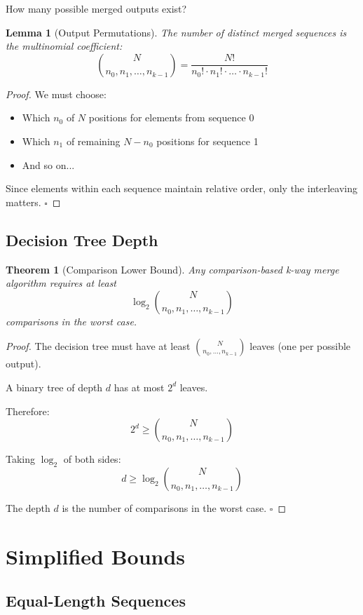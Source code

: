 \documentclass[11pt]{article}
\newtheorem{theorem}{Theorem}
\newtheorem{lemma}{Lemma}
\begin{document}
How many possible merged outputs exist?

\begin{lemma}[Output Permutations]
The number of distinct merged sequences is the multinomial coefficient:
\[
\binom{N}{n_0, n_1, \ldots, n_{k-1}} = \frac{N!}{n_0! \cdot n_1! \cdot \ldots \cdot n_{k-1}!}
\]
\end{lemma}

\begin{proof}
We must choose:
\begin{itemize}
    \item Which $n_0$ of $N$ positions for elements from sequence 0
    \item Which $n_1$ of remaining $N-n_0$ positions for sequence 1
    \item And so on...
\end{itemize}

Since elements within each sequence maintain relative order, only the interleaving matters.
$\square$
\end{proof}

\subsection{Decision Tree Depth}

\begin{theorem}[Comparison Lower Bound]
Any comparison-based k-way merge algorithm requires at least
\[
\log_2 \binom{N}{n_0, n_1, \ldots, n_{k-1}}
\]
comparisons in the worst case.
\end{theorem}

\begin{proof}
The decision tree must have at least $\binom{N}{n_0, \ldots, n_{k-1}}$ leaves (one per possible output).

A binary tree of depth $d$ has at most $2^d$ leaves.

Therefore:
\[
2^d \geq \binom{N}{n_0, n_1, \ldots, n_{k-1}}
\]

Taking $\log_2$ of both sides:
\[
d \geq \log_2 \binom{N}{n_0, n_1, \ldots, n_{k-1}}
\]

The depth $d$ is the number of comparisons in the worst case. $\square$
\end{proof}

\section{Simplified Bounds}

\subsection{Equal-Length Sequences}
\end{document}
